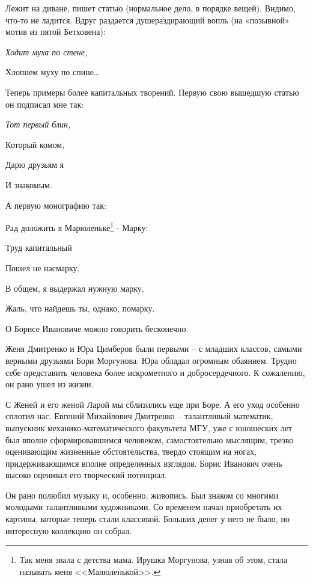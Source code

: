 \indent		

	Лежит на диване, пишет статью (нормальное дело, в порядке вещей). Видимо, что-то не ладится. Вдруг раздается душераздирающий вопль (на «позывной» мотив из пятой Бетховена):

\indent

{\itshape
		Ходит муха по стене,
		
		Хлопнем муху по спине…
}		

\indent

Теперь примеры более капитальных творений. Первую свою вышедшую статью он подписал мне так:

\indent

{\itshape
		Тот первый блин,
		
        Который комом,
        
        Дарю друзьям я
        
        И знакомым.
}

\indent

А первую монографию так:

\indent

{\itshape	

	Рад доложить я Марюленьке\footnote{Так меня звала с детства мама. Ирушка Моргунова, узнав об этом, стала называть меня <<Малюленькой>>.} - Марку:

	Труд капитальный
	
	Пошел не насмарку.
	
	В общем, я выдержал нужную марку,
	
	Жаль, что найдешь ты, однако, помарку.
}	

\indent

О Борисе Ивановиче можно говорить бесконечно.

Женя Дмитренко и Юра Цимберов были первыми – с младших классов, самыми верными друзьями Бори Моргунова. Юра обладал огромным обаянием. Трудно себе представить человека более искрометного и добросердечного. К сожалению, он рано ушел из жизни.

С Женей и его женой Ларой мы сблизились еще при Боре. А его уход особенно сплотил нас. Евгений Михайлович Дмитренко – талантливый математик, выпускник механико-математического факультета МГУ, уже с юношеских лет был вполне сформировавшимся человеком, самостоятельно мыслящим, трезво оценивающим жизненные обстоятельства, твердо стоящим на ногах, придерживающимся вполне определенных взглядов. Борис Иванович очень высоко оценивал его творческий потенциал.

Он рано полюбил музыку и, особенно, живопись. Был знаком со многими молодыми талантливыми художниками. Со временем начал приобретать их картины, которые теперь стали классикой. Больших денег у него не было, но интересную коллекцию он собрал.

